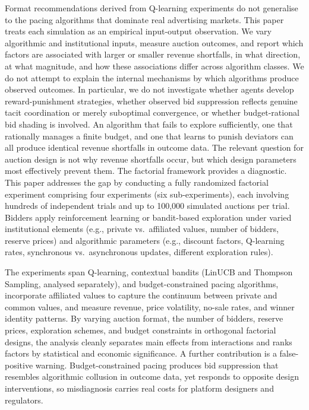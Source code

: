 Format recommendations derived from Q-learning experiments do not generalise to the pacing algorithms that dominate real advertising markets. This paper treats each simulation as an empirical input-output observation. We vary algorithmic and institutional inputs, measure auction outcomes, and report which factors are associated with larger or smaller revenue shortfalls, in what direction, at what magnitude, and how these associations differ across algorithm classes. We do not attempt to explain the internal mechanisms by which algorithms produce observed outcomes. In particular, we do not investigate whether agents develop reward-punishment strategies, whether observed bid suppression reflects genuine tacit coordination or merely suboptimal convergence, or whether budget-rational bid shading is involved. An algorithm that fails to explore sufficiently, one that rationally manages a finite budget, and one that learns to punish deviators can all produce identical revenue shortfalls in outcome data. The relevant question for auction design is not why revenue shortfalls occur, but which design parameters most effectively prevent them. The factorial framework provides a diagnostic. This paper addresses the gap by conducting a fully randomized factorial experiment comprising four experiments (six sub-experiments), each involving hundreds of independent trials and up to 100,000 simulated auctions per trial. Bidders apply reinforcement learning or bandit-based exploration under varied institutional elements (e.g., private vs.\ affiliated values, number of bidders, reserve prices) and algorithmic parameters (e.g., discount factors, Q-learning rates, synchronous vs.\ asynchronous updates, different exploration rules).

The experiments span Q-learning, contextual bandits (LinUCB and Thompson Sampling, analysed separately), and budget-constrained pacing algorithms, incorporate affiliated values to capture the continuum between private and common values, and measure revenue, price volatility, no-sale rates, and winner identity patterns. By varying auction format, the number of bidders, reserve prices, exploration schemes, and budget constraints in orthogonal factorial designs, the analysis cleanly separates main effects from interactions and ranks factors by statistical and economic significance. A further contribution is a false-positive warning. Budget-constrained pacing produces bid suppression that resembles algorithmic collusion in outcome data, yet responds to opposite design interventions, so misdiagnosis carries real costs for platform designers and regulators.

